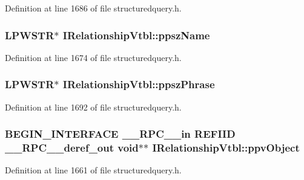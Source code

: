 Definition at line 1686 of file structuredquery.\+h.

\subsubsection[{\texorpdfstring{ppsz\+Name}{ppszName}}]{ {\bf L\+P\+W\+S\+TR}$\ast$ I\+Relationship\+Vtbl\+::ppsz\+Name}\hypertarget{struct_i_relationship_vtbl_ad4cb8bc7dcba6d65e9f2a9f427870197}{}\label{struct_i_relationship_vtbl_ad4cb8bc7dcba6d65e9f2a9f427870197}


Definition at line 1674 of file structuredquery.\+h.

\subsubsection[{\texorpdfstring{ppsz\+Phrase}{ppszPhrase}}]{ {\bf L\+P\+W\+S\+TR}$\ast$ I\+Relationship\+Vtbl\+::ppsz\+Phrase}\hypertarget{struct_i_relationship_vtbl_a8601d3a9d2d82644a746f344e641e3a6}{}\label{struct_i_relationship_vtbl_a8601d3a9d2d82644a746f344e641e3a6}


Definition at line 1692 of file structuredquery.\+h.

\subsubsection[{\texorpdfstring{ppv\+Object}{ppvObject}}]{\setlength{\rightskip}{0pt plus 5cm}B\+E\+G\+I\+N\+\_\+\+I\+N\+T\+E\+R\+F\+A\+CE {\bf \+\_\+\+\_\+\+R\+P\+C\+\_\+\+\_\+in} {\bf R\+E\+F\+I\+ID} {\bf \+\_\+\+\_\+\+R\+P\+C\+\_\+\+\_\+deref\+\_\+out} {\bf void}$\ast$$\ast$ I\+Relationship\+Vtbl\+::ppv\+Object}\hypertarget{struct_i_relationship_vtbl_abfc792c52dc14b2e4339dba8a6db788f}{}\label{struct_i_relationship_vtbl_abfc792c52dc14b2e4339dba8a6db788f}


Definition at line 1661 of file structuredquery.\+h.

